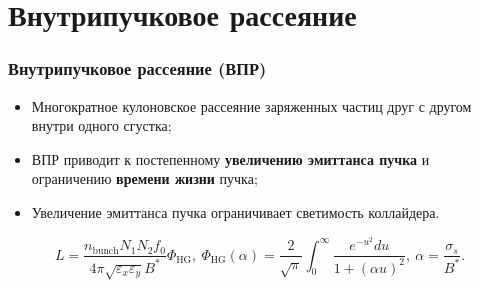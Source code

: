 \section{Внутрипучковое рассеяние} %

\begin{frame}
	\frametitle{Внутрипучковое рассеяние (ВПР)}
	\begin{itemize}
		\item Многократное кулоновское рассеяние заряженных частиц друг с другом внутри одного сгустка;
		\item ВПР приводит к постепенному \textbf{увеличению эмиттанса пучка} и ограничению \textbf{времени жизни} пучка;
		\item Увеличение эмиттанса пучка ограничивает светимость коллайдера.
	\end{itemize}
	\vspace{0.5cm} 
	\begin{equation}
		L=\frac{n_{\mathrm{bunch}}N_1N_2f_0}{4\pi\sqrt{\varepsilon_x\varepsilon_y}B^\ast}\Phi_{\textrm{HG}}, \
		\Phi_{\textrm{HG}}(\alpha)=\frac{2}{\sqrt\pi}\int_{0}^{\infty}\frac{e^{-u^2}du}{1+(\alpha u)^2},\
		\alpha=\frac{\sigma_s}{B^\ast}.
		\label{eq:luminocity}
	\end{equation}
\end{frame}

